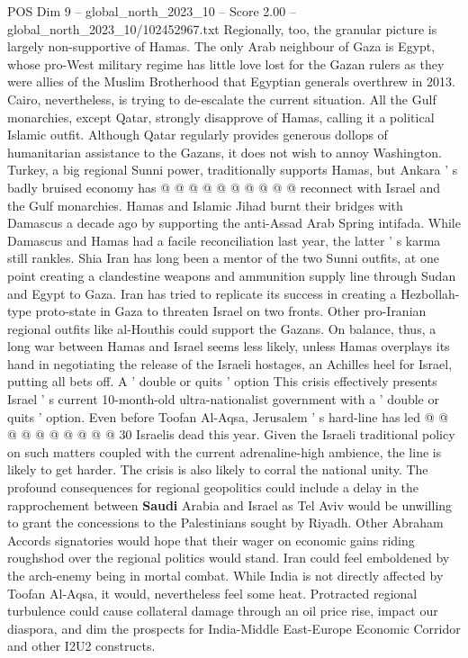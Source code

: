 \begin{textsample}{POS Dim 9 – global\_north\_2023\_10 – Score 2.00 – global\_north\_2023\_10/102452967.txt}
Regionally, too, the granular picture is largely non-supportive of Hamas.
The only Arab neighbour of Gaza is Egypt, whose pro-West military regime has little love lost for the Gazan rulers as they were allies of the Muslim Brotherhood that Egyptian generals overthrew in 2013.
Cairo, nevertheless, is trying to de-escalate the current situation.
All the Gulf monarchies, except Qatar, strongly disapprove of Hamas, calling it a political Islamic outfit.
Although Qatar regularly provides generous dollops of humanitarian assistance to the Gazans, it does not wish to annoy Washington.
Turkey, a big regional Sunni power, traditionally supports Hamas, but Ankara ' s badly bruised economy has @ @ @ @ @ @ @ @ @ @ reconnect with Israel and the Gulf monarchies.
Hamas and Islamic Jihad burnt their bridges with Damascus a decade ago by supporting the anti-Assad Arab Spring intifada.
While Damascus and Hamas had a facile reconciliation last year, the latter ' s karma still rankles.
Shia Iran has long been a mentor of the two Sunni outfits, at one point creating a clandestine weapons and ammunition supply line through Sudan and Egypt to Gaza.
Iran has tried to replicate its success in creating a Hezbollah-type proto-state in Gaza to threaten Israel on two fronts.
Other pro-Iranian regional outfits like al-Houthis could support the Gazans.
On balance, thus, a long war between Hamas and Israel seems less likely, unless Hamas overplays its hand in negotiating the release of the Israeli hostages, an Achilles heel for Israel, putting all bets off.
A ' double or quits ' option This crisis effectively presents Israel ' s current 10-month-old ultra-nationalist government with a ' double or quits ' option.
Even before Toofan Al-Aqsa, Jerusalem ' s hard-line has led @ @ @ @ @ @ @ @ @ @ 30 Israelis dead this year.
Given the Israeli traditional policy on such matters coupled with the current adrenaline-high ambience, the line is likely to get harder.
The crisis is also likely to corral the national unity.
The profound consequences for regional geopolitics could include a delay in the rapprochement between \textbf{Saudi} Arabia and Israel as Tel Aviv would be unwilling to grant the concessions to the Palestinians sought by Riyadh.
Other Abraham Accords signatories would hope that their wager on economic gains riding roughshod over the regional politics would stand.
Iran could feel emboldened by the arch-enemy being in mortal combat.
While India is not directly affected by Toofan Al-Aqsa, it would, nevertheless feel some heat.
Protracted regional turbulence could cause collateral damage through an oil price rise, impact our diaspora, and dim the prospects for India-Middle East-Europe Economic Corridor and other I2U2 constructs.

\end{textsample}
